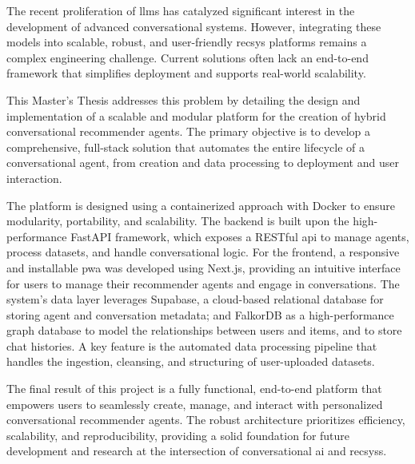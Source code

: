 
The recent proliferation of \acp{llm} has catalyzed significant interest in the development of advanced conversational systems. However, integrating these models into scalable, robust, and user-friendly \acl{recsys} platforms remains a complex engineering challenge. Current solutions often lack an end-to-end framework that simplifies deployment and supports real-world scalability.

This Master's Thesis addresses this problem by detailing the design and implementation of a scalable and modular platform for the creation of hybrid conversational recommender agents. The primary objective is to develop a comprehensive, full-stack solution that automates the entire lifecycle of a conversational agent, from creation and data processing to deployment and user interaction.

The platform is designed using a containerized approach with Docker to ensure modularity, portability, and scalability. The backend is built upon the high-performance FastAPI framework, which exposes a RESTful \ac{api} to manage agents, process datasets, and handle conversational logic. For the frontend, a responsive and installable \ac{pwa} was developed using Next.js, providing an intuitive interface for users to manage their recommender agents and engage in conversations. The system's data layer leverages Supabase, a cloud-based relational database for storing agent and conversation metadata; and FalkorDB as a high-performance graph database to model the relationships between users and items, and to store chat histories. A key feature is the automated data processing pipeline that handles the ingestion, cleansing, and structuring of user-uploaded datasets.

The final result of this project is a fully functional, end-to-end platform that empowers users to seamlessly create, manage, and interact with personalized conversational recommender agents. The robust architecture prioritizes efficiency, scalability, and reproducibility, providing a solid foundation for future development and research at the intersection of conversational \acs{ai} and \acl{recsys}s.

